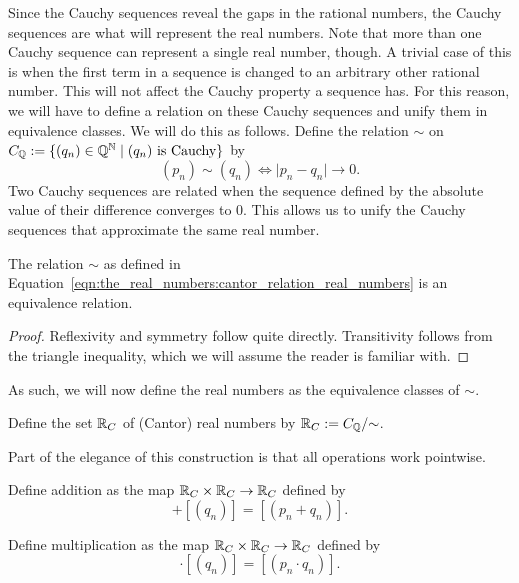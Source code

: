 \documentclass[../main.tex]{subfiles}
\begin{document}
Since the Cauchy sequences reveal the gaps in the rational numbers, the Cauchy sequences are what will represent the real numbers. Note that more than one Cauchy sequence can represent a single real number, though. A trivial case of this is when the first term in a sequence is changed to an arbitrary other rational number. This will not affect the Cauchy property a sequence has. For this reason, we will have to define a relation on these Cauchy sequences and unify them in equivalence classes. We will do this as follows. Define the relation $\sim$ on $C_{\mathbb{Q}}:=\{(q_n)\in\mathbb{Q}^{\mathbb{N}}\mid(q_n)\text{ is Cauchy}\}$ by
\begin{equation}\label{eqn:the_real_numbers:cantor_relation_real_numbers}
    (p_n)\sim(q_n)\iff\vert p_n-q_n\vert\to0.
\end{equation}
Two Cauchy sequences are related when the sequence defined by the absolute value of their difference converges to $0$. This allows us to unify the Cauchy sequences that approximate the same real number.
\begin{lemma}
    The relation $\sim$ as defined in Equation~\eqref{eqn:the_real_numbers:cantor_relation_real_numbers} is an equivalence relation.
\end{lemma}
\begin{proof}
    Reflexivity and symmetry follow quite directly. Transitivity follows from the triangle inequality, which we will assume the reader is familiar with.
\end{proof}
As such, we will now define the real numbers as the equivalence classes of $\sim$.
\begin{definition}
    Define the set $\mathbb{R}_C$ of (Cantor) real numbers by $\mathbb{R}_C:=C_{\mathbb{Q}}/{\sim}$.
\end{definition}
Part of the elegance of this construction is that all operations work pointwise.
\begin{definition}
    Define addition as the map $\mathbb{R}_C\times\mathbb{R}_C\to\mathbb{R}_C$ defined by
    \begin{equation*}
        [(p_n)]+[(q_n)]=[(p_n+q_n)].
    \end{equation*}
\end{definition}
\begin{definition}
    Define multiplication as the map $\mathbb{R}_C\times\mathbb{R}_C\to\mathbb{R}_C$ defined by
    \begin{equation*}
        [(p_n)]\cdot[(q_n)]=[(p_n\cdot q_n)].
    \end{equation*}
\end{definition}
\end{document}
